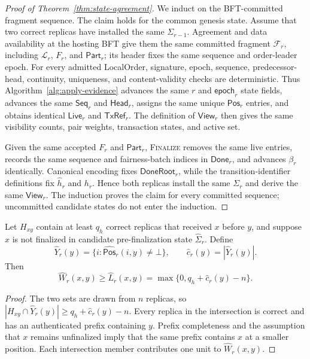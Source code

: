 \begin{proof}[Proof of Theorem~\ref{thm:state-agreement}]
We induct on the BFT-committed fragment sequence.  The claim holds for the
common genesis state.  Assume that two correct replicas have installed the
same $\Sigma_{r-1}$.  Agreement and data availability at the hosting BFT give
them the same committed fragment $\mathcal F_r$, including
$\mathcal L_r$, $F_r$, and $\mathsf{Part}_r$; its header fixes the same sequence
and order-leader epoch.  For every admitted LocalOrder,
signature, epoch, sequence, predecessor-head, continuity, uniqueness, and
content-validity checks are deterministic.  Thus
Algorithm~\ref{alg:apply-evidence} advances the same
$r$ and $\mathsf{epoch}_r$ state fields, advances the same
$\mathsf{Seq}_r$ and $\mathsf{Head}_r$, assigns the same unique
$\mathsf{Pos}_r$ entries, and obtains identical $\mathsf{Live}_r$ and
$\mathsf{TxRef}_r$.  The definition of $\mathsf{View}_r$ then gives the same
visibility counts, pair weights, transaction states, and active set.

Given the same accepted $F_r$ and $\mathsf{Part}_r$, \textsc{Finalize}
removes the same live entries, records the same sequence and fairness-batch
indices in $\mathsf{Done}_r$, and advances $\beta_r$ identically.  Canonical
encoding fixes $\mathsf{DoneRoot}_r$, while
the transition-identifier definitions fix $\widehat h_r$ and $h_r$.  Hence both
replicas install the same $\Sigma_r$ and derive the same
$\mathsf{View}_r$.  The induction proves the claim for every committed sequence;
uncommitted candidate states do not enter the induction.
\end{proof}

\begin{lemma}
\label{lem:committed-observation-coverage}
Let $H_{xy}$ contain at least $q_h$ correct replicas that received $x$ before
$y$, and suppose $x$ is not finalized in candidate pre-finalization state
$\widehat\Sigma_r$.  Define
\[
 \widehat Y_r(y)=\{i:\widehat{\mathsf{Pos}}_r(i,y)\ne\bot\},
 \qquad \widehat c_r(y)=|\widehat Y_r(y)|.
\]
Then
\begin{equation}
 \widehat W_r(x,y)\ge \widehat L_r(x,y)
   =\max\{0,q_h+\widehat c_r(y)-n\}.
 \label{eq:coverage-lower-bound}
\end{equation}
\end{lemma}

\begin{proof}
The two sets are drawn from $n$ replicas, so
$|H_{xy}\cap\widehat Y_r(y)|\ge q_h+\widehat c_r(y)-n$.  Every replica in the
intersection is correct and has an authenticated prefix containing $y$.
Prefix completeness and
the assumption that $x$ remains unfinalized imply that the same prefix contains
$x$ at a smaller position.  Each intersection member contributes one unit to
$\widehat W_r(x,y)$.
\end{proof}

